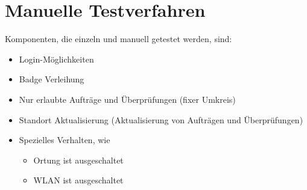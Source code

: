 \section{Manuelle Testverfahren}
Komponenten, die einzeln und manuell getestet werden, sind:
\begin{itemize}
	\item Login-Möglichkeiten
	\item Badge Verleihung
	\item Nur erlaubte Aufträge und Überprüfungen (fixer Umkreis)
	\item Standort Aktualisierung (Aktualisierung von Aufträgen und Überprüfungen)
	\item Spezielles Verhalten, wie
	\begin{itemize}
		\item Ortung ist ausgeschaltet
		\item WLAN ist ausgeschaltet
	\end{itemize}
\end{itemize}
